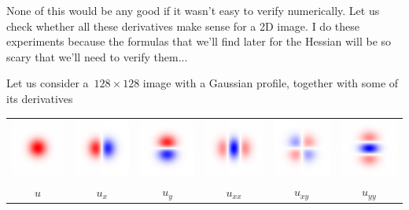 None of this would be any good if it wasn't easy to verify numerically.  Let
us check whether all these derivatives make sense for a 2D image.  I do these
experiments because the formulas that we'll find later for the Hessian will
be so scary that we'll need to verify them...

Let us consider a~$128\times128$ image with a Gaussian profile, together with
some of its derivatives


\begin{tabular}{cccccc}
\includegraphics{fgauss.png} &
\includegraphics{fgaussx.png} &
\includegraphics{fgaussy.png} &
\includegraphics{fgaussxx.png} &
\includegraphics{fgaussxy.png} &
\includegraphics{fgaussyy.png} \\
$u$ & $u_x$ & $u_y$ & $u_{xx}$ & $u_{xy}$ & $u_{yy}$
\end{tabular}
